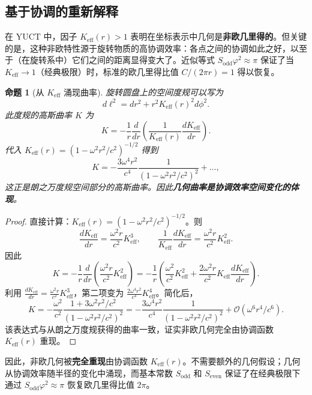 \documentclass[12pt,a4paper]{article}
\newtheorem{proposition}{命题}[section]
\newcommand{\Sodd}{S_{\mathrm{odd}}}
\newcommand{\Seven}{S_{\mathrm{even}}}
\begin{document}
	\subsection{基于协调的重新解释}
	在 YUCT 中，因子 \(K_{\mathrm{eff}}(r) > 1\) 表明在坐标表示中几何是\textbf{非欧几里得的}。但关键的是，这种非欧特性源于旋转物质的高协调效率：各点之间的协调如此之好，以至于（在旋转系中）它们之间的距离显得变大了。近似等式 \(\Sodd \varphi^2 \approx \pi\) 保证了当 \(K_{\mathrm{eff}} \to 1\)（经典极限）时，标准的欧几里得比值 \(C/(2\pi r) = 1\) 得以恢复。
	
	\begin{proposition}[从 \(K_{\mathrm{eff}}\) 涌现曲率]
		旋转圆盘上的空间度规可以写为
		\[
		d\ell^2 = dr^2 + r^2 K_{\mathrm{eff}}(r)^2 d\phi^2.
		\]
		此度规的高斯曲率 \(K\) 为
		\[
		K = -\frac{1}{r} \frac{d}{dr}\left( \frac{1}{K_{\mathrm{eff}}(r)} \frac{dK_{\mathrm{eff}}}{dr} \right).
		\]
		代入 \(K_{\mathrm{eff}}(r) = (1 - \omega^2 r^2/c^2)^{-1/2}\) 得到
		\[
		K = -\frac{3\omega^4 r^2}{c^4} \frac{1}{(1 - \omega^2 r^2/c^2)^2} + \dots,
		\]
		这正是朗之万度规空间部分的高斯曲率。因此\textbf{几何曲率是协调效率空间变化的体现}。
	\end{proposition}
	
	\begin{proof}
		直接计算：\(K_{\mathrm{eff}}(r) = (1 - \omega^2 r^2/c^2)^{-1/2}\)。则
		\[
		\frac{dK_{\mathrm{eff}}}{dr} = \frac{\omega^2 r}{c^2} K_{\mathrm{eff}}^3,\qquad
		\frac{1}{K_{\mathrm{eff}}} \frac{dK_{\mathrm{eff}}}{dr} = \frac{\omega^2 r}{c^2} K_{\mathrm{eff}}^2.
		\]
		因此
		\[
		K = -\frac{1}{r} \frac{d}{dr}\left( \frac{\omega^2 r}{c^2} K_{\mathrm{eff}}^2 \right) = -\frac{1}{r} \left( \frac{\omega^2}{c^2} K_{\mathrm{eff}}^2 + \frac{2\omega^2 r}{c^2} K_{\mathrm{eff}} \frac{dK_{\mathrm{eff}}}{dr} \right).
		\]
		利用 \(\frac{dK_{\mathrm{eff}}}{dr} = \frac{\omega^2 r}{c^2} K_{\mathrm{eff}}^3\)，第二项变为 \(\frac{2\omega^4 r^2}{c^4} K_{\mathrm{eff}}^4\)。简化后，
		\[
		K = -\frac{\omega^2}{c^2} \frac{1 + 3\omega^2 r^2/c^2}{(1 - \omega^2 r^2/c^2)^2} = -\frac{3\omega^4 r^2}{c^4} \frac{1}{(1 - \omega^2 r^2/c^2)^2} + \mathcal{O}(\omega^6 r^4/c^6).
		\]
		该表达式与从朗之万度规获得的曲率一致，证实非欧几何完全由协调函数 \(K_{\mathrm{eff}}(r)\) 重现。
	\end{proof}
	
	因此，非欧几何被\textbf{完全重现}由协调函数 \(K_{\mathrm{eff}}(r)\)。不需要额外的几何假设；几何从协调效率随半径的变化中涌现，而基本常数 \(\Sodd\) 和 \(\Seven\) 保证了在经典极限下通过 \(\Sodd \varphi^2 \approx \pi\) 恢复欧几里得比值 \(2\pi\)。
	
\end{document}
